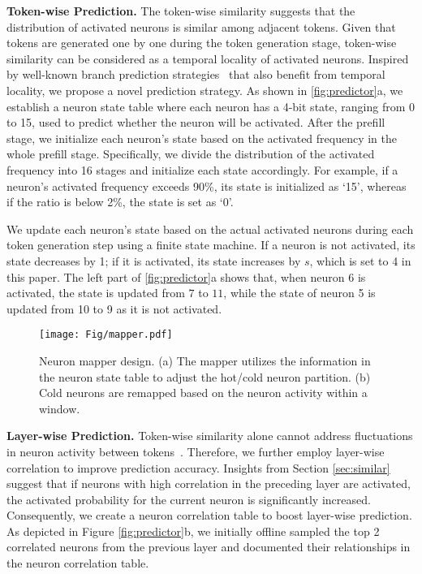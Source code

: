 \textbf{Token-wise Prediction. } The token-wise similarity suggests that the distribution of activated neurons is similar among adjacent tokens. Given that tokens are generated one by one during the token generation stage, token-wise similarity can be considered as a temporal locality of activated neurons. Inspired by well-known branch prediction strategies~\cite{smith1981study, yeh1991two, mcfarling1993combining} that also benefit from temporal locality, we propose a novel prediction strategy. As shown in \fig \ref{fig:predictor}a, we establish a neuron state table where each neuron has a 4-bit state, ranging from 0 to 15, used to predict whether the neuron will be activated. After the prefill stage, we initialize each neuron's state based on the activated frequency in the whole prefill stage. Specifically, we divide the distribution of the activated frequency into 16 stages and initialize each state accordingly. For example, if a neuron's activated frequency exceeds 90\%, its state is initialized as `15', whereas if the ratio is below 2\%, the state is set as `0'.

We update each neuron's state based on the actual activated neurons during each token generation step using a finite state machine. If a neuron is not activated, its state decreases by 1; if it is activated, its state increases by \( s \), which is set to 4 in this paper. The left part of \fig \ref{fig:predictor}a shows that, when neuron 6 is activated, the state is updated from $7$ to $11$, while the state of neuron 5 is updated from 10 to 9 as it is not activated.  

\begin{figure}
    \centering
    \texttt{[image: Fig/mapper.pdf]}
    \vspace{-0.3cm}
    \caption{Neuron mapper design. (a) The mapper utilizes the information in the neuron state table to adjust the hot/cold neuron partition. (b) Cold neurons are remapped based on the neuron activity within a window.}
    \label{fig:mapper}
\vspace{-0.3cm}
\end{figure}

\textbf{Layer-wise Prediction. } 
Token-wise similarity alone cannot address fluctuations in neuron activity between tokens~\cite{zhang2024relu, zheng2024learn}. Therefore, we further employ layer-wise correlation to improve prediction accuracy. Insights from Section \ref{sec:similar} suggest that if neurons with high correlation in the preceding layer are activated, the activated probability for the current neuron is significantly increased. Consequently, we create a neuron correlation table to boost layer-wise prediction. As depicted in Figure \ref{fig:predictor}b, we initially offline sampled the top 2 correlated neurons from the previous layer and documented their relationships in the neuron correlation table.

